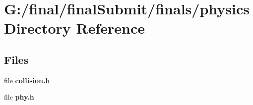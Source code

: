 \section{G\-:/final/final\-Submit/finals/physics Directory Reference}
\label{dir_dfe929bb24aa964a4241e9e79f2cc5c7}
\subsection*{Files}
\begin{DoxyCompactItemize}
\item 
file {\bf collision.\-h}
\item 
file {\bf phy.\-h}
\end{DoxyCompactItemize}
